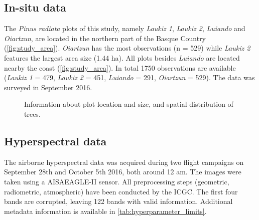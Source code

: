\documentclass[review]{elsarticle}
\begin{document}
\subsection{In-situ data}

\noindent The \textit{Pinus radiata} plots of this study, namely \textit{Laukiz 1}, \textit{Laukiz 2}, \textit{Luiando} and \textit{Oiartzun}, are located in the northern part of the Basque Country (\autoref{fig:study_area}).
\textit{Oiartzun} has the most observations (n = 529) while \textit{Laukiz 2} features the largest area size (1.44 ha).
All plots besides \textit{Luiando} are located nearby the coast (\autoref{fig:study_area}).
In total 1750 observations are available (\textit{Laukiz 1} = 479, \textit{Laukiz 2} = 451, \textit{Luiando} = 291, \textit{Oiartzun} = 529).
The data was surveyed in September 2016.

\begin{figure} [t!]
	\begin{center}
		\caption{Information about plot location and size, and spatial distribution of trees.}
		\label{fig:study_area}
	\end{center}
\end{figure}


\subsection{Hyperspectral data}

\noindent The airborne hyperspectral data was acquired during two flight campaigns on September 28th and October 5th 2016, both around 12 am.
The images were taken using a AISAEAGLE-II sensor.
All preprocessing steps (geometric, radiometric, atmospheric) have been conducted by the \ac{ICGC}.
The first four bands are corrupted, leaving 122 bands with valid information.
Additional metadata information is available in \autoref{tab:hyperparameter_limits}.
\end{document}
